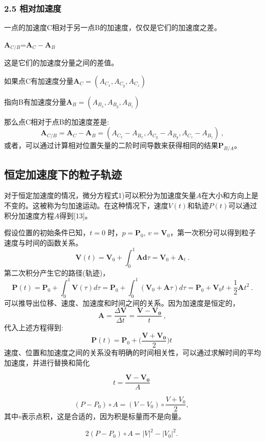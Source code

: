 \subsubsection{2.5 相对加速度}

一点的加速度C相对于另一点B的加速度，仅仅是它们的加速度之差。

$\mathbf{A}_{C/B}$=$\mathbf{A}_{C}-\mathbf{A}_{B}$

这是它们的加速度分量之间的差值。


如果点C有加速度分量$\mathbf{A}_{C}=(A_{C_x},A_{C_y},A_{C_z})$

指向B有加速度分量$\mathbf{A}_{B}=(A_{B_x},A_{B_y},A_{B_z})$

那么点C相对于点B的加速度差是:
$$\mathbf{A}_{C/B} = \mathbf{A}_{C}-\mathbf{A}_{B} = (A_{C_x}-A_{B_x},A_{C_y}-A_{B_y},A_{C_z}-A_{B_z})~,$$
或者，可以通过计算相对位置矢量的二阶时间导数来获得相同的结果$\mathbf{P}_{B/A}$。

\subsection{恒定加速度下的粒子轨迹}

对于恒定加速度的情况，微分方程式1)可以积分为加速度矢量${A}$在大小和方向上是不变的。这被称为匀加速运动。在这种情况下，速度$V(t)$和轨迹$P(t)$可以通过积分加速度方程$A$得到[13]。

假设位置的初始条件已知，$t=0$ 时，$p=\mathbf{P}_0$, $v=\mathbf{V}_0$，第一次积分可以得到粒子速度与时间的函数关系。
$$\mathbf{V}(t)=\mathbf{V}_{0} + \int_{0}^{1}\mathbf{Ad}\tau = \mathbf{V}_{0}+\mathbf{A}_{t}~.$$
第二次积分产生它的路径(轨迹)，
$$\mathbf{P}(t)=\mathbf{P}_{0}+\int_{0}^{1}\mathbf{V}(\tau )d\tau=\mathbf{P}_{0}+\int_{0}^{1}(\mathbf{V}_{0}+\mathbf{A}\tau)d\tau=\mathbf{P}_{0}+\mathbf{V}_{0}t+\frac{1}{2}\mathbf{A}t^2~.$$
可以推导出位移、速度、加速度和时间之间的关系。因为加速度是恒定的，
$$\mathbf{A} = \frac{\Delta \mathbf{V}}{\Delta t}=\frac{\mathbf{V}-\mathbf{V_0}}{t}~,$$
代入上述方程得到:
$$\mathbf{P}(t)=\mathbf{P}_{0}+\Big(\frac{\mathbf{V}+\mathbf{V_0}}{2}\Big )t~$$
速度、位置和加速度之间的关系没有明确的时间相关性，可以通过求解时间的平均加速度，并进行替换和简化

$$t=\frac{\mathbf{V}-\mathbf{V_0}}{A}~$$

\begin{equation}
(P - P_0) \circ A = (V - V_0) \circ \frac{V + V_0}{2},~
\end{equation}
其中$\circ$表示点积，这是合适的，因为积是标量而不是向量。

\begin{equation}
2(P - P_0) \circ A = |V|^2 - |V_0|^2.~
\end{equation}

